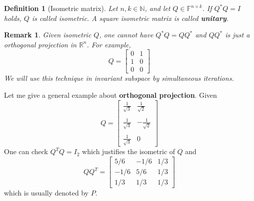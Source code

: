 \documentclass[11pt]{article}
\newtheorem{Definition}[Theorem]{Definition}
\newtheorem{Remark}[Theorem]{Remark}
\begin{document}
\begin{Definition}[Isometric matrix]
    Let $n, k \in \mathbb{N}$, and let $Q \in \mathbb{F}^{n \times k}$. If $Q^{*} Q=I$ holds, $Q$ is called isometric. A square isometric matrix is called \textbf{unitary}. 
\end{Definition}

\begin{Remark}
   Given isometric $Q$, one cannot have $Q^{*}Q= QQ^{*}$ and $Q Q^{*}$ is just a orthogonal projection in $\mathbb{R}^{n}$. For example,
   $$
   Q = \begin{bmatrix}
       0 & 1\\
       1 & 0\\
       0 & 0
   \end{bmatrix}
   $$
   We will use this technique in invariant subspace by simultaneous iterations.
\end{Remark}


Let me give a general example about \textbf{orthogonal projection}. Given
$$
Q = \left[\begin{array}{cc}
   \frac{1}{\sqrt{3}} &  \frac{1}{\sqrt{2}}\\
                   &                       \\
   \frac{1}{\sqrt{3}} &  -\frac{1}{\sqrt{2}}\\
                       &                    \\
   \frac{1}{\sqrt{3}} &   0
\end{array}\right]
$$
One can check $Q^{T}Q = I_{2}$ which justifies the isometric of $Q$ and 
$$
QQ^{T} = \begin{bmatrix}
   5/6 & -1/6 & 1/3 \\
   -1/6 & 5/6 & 1/3\\
   1/3 & 1/3 & 1/3
\end{bmatrix}
$$
which is usually denoted by $P$.
\end{document}
